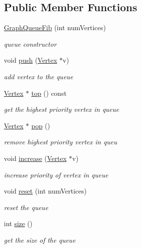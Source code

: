 \subsection*{Public Member Functions}
\begin{DoxyCompactItemize}
\item 
\hyperlink{class_graph_queue_fib_ac6d57ed1a0dc58f986aea1a1d149a154}{Graph\+Queue\+Fib} (int num\+Vertices)
\begin{DoxyCompactList}\small\item\em queue constructor \end{DoxyCompactList}\item 
void \hyperlink{class_graph_queue_fib_adbf6c8d5e43cfcb5cedc2fcce60c643a}{push} (\hyperlink{class_vertex}{Vertex} $\ast$v)
\begin{DoxyCompactList}\small\item\em add vertex to the queue \end{DoxyCompactList}\item 
\hyperlink{class_vertex}{Vertex} $\ast$ \hyperlink{class_graph_queue_fib_a3b1b6a0bf8007559ba3f66978413845c}{top} () const 
\begin{DoxyCompactList}\small\item\em get the highest priority vertex in queue \end{DoxyCompactList}\item 
\hyperlink{class_vertex}{Vertex} $\ast$ \hyperlink{class_graph_queue_fib_ae0ab49ac553d1872c9cc7da0790b0ee3}{pop} ()
\begin{DoxyCompactList}\small\item\em remove highest priority vertex in queu \end{DoxyCompactList}\item 
void \hyperlink{class_graph_queue_fib_a9c1a2e35ab5a0a02dc527a29c935eda7}{increase} (\hyperlink{class_vertex}{Vertex} $\ast$v)
\begin{DoxyCompactList}\small\item\em increase priority of vertex in queue \end{DoxyCompactList}\item 
void \hyperlink{class_graph_queue_fib_a121fe18933b525f9c3d6aed394e9a69c}{reset} (int num\+Vertices)
\begin{DoxyCompactList}\small\item\em reset the queue \end{DoxyCompactList}\item 
int \hyperlink{class_graph_queue_fib_a0ce2194cd1779da1f22551f5e0ffd0f2}{size} ()
\begin{DoxyCompactList}\small\item\em get the size of the queue \end{DoxyCompactList}\end{DoxyCompactItemize}


